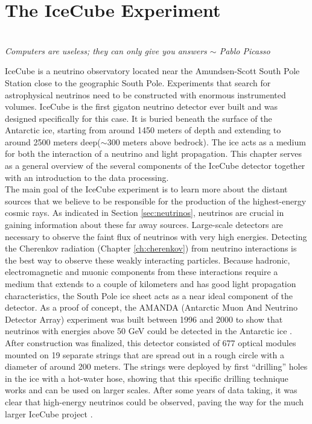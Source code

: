 \chapter{The IceCube Experiment}
\label{ch:icecube}
\begin{flushright}
\textit{\\Computers are useless; they can only give you answers $\sim$ Pablo Picasso\\}
\end{flushright}
IceCube is a neutrino observatory located near the Amundsen-Scott South Pole Station close to the geographic South Pole. Experiments that search for astrophysical neutrinos need to be constructed with enormous instrumented volumes. IceCube is the first gigaton neutrino detector ever built and was designed specifically for this case. It is buried beneath the surface of the Antarctic ice, starting from around 1450 meters of depth and extending to around 2500 meters deep($\sim$300 meters above bedrock). The ice acts as a medium for both the interaction of a neutrino and light propagation. This chapter serves as a general overview of the several components of the IceCube detector together with an introduction to the data processing.\\
\newline
\noindent The main goal of the IceCube experiment is to learn more about the distant sources that we believe to be responsible for the production of the highest-energy cosmic rays. As indicated in Section \ref{sec:neutrinos}, neutrinos are crucial in gaining information about these far away sources. Large-scale detectors are necessary to observe the faint flux of neutrinos with very high energies. Detecting the Cherenkov radiation (Chapter \ref{ch:cherenkov}) from neutrino interactions is the best way to observe these weakly interacting particles. Because hadronic, electromagnetic and muonic components from these interactions require a medium that extends to a couple of kilometers and has good light propagation characteristics, the South Pole ice sheet acts as a near ideal component of the detector. As a proof of concept, the AMANDA (Antarctic Muon And Neutrino Detector Array) experiment was built between 1996 and 2000 to show that neutrinos with energies above 50 GeV could be detected in the Antarctic ice \cite{amandaurl,Andres:1999hm}. After construction was finalized, this detector consisted of 677 optical modules mounted on 19 separate strings that are spread out in a rough circle with a diameter of around 200 meters. The strings were deployed by first ``drilling'' holes in the ice with a hot-water hose, showing that this specific drilling technique works and can be used on larger scales. After some years of data taking, it was clear that high-energy neutrinos could be observed, paving the way for the much larger IceCube project \cite{Ahrens:2002gq}.



